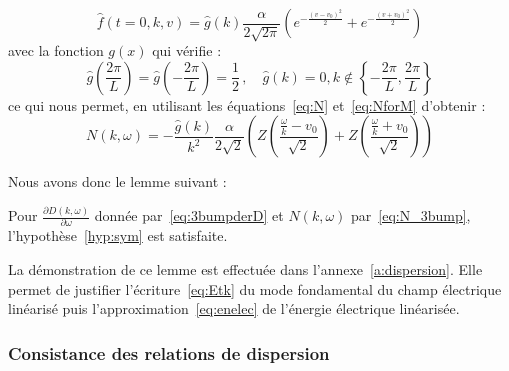 $$
  \hat{f}(t=0,k,v) = \hat{g}(k) \frac{\alpha}{2\sqrt{2\pi}}\left( e^{-\frac{(v-v_0)^2}{2}} + e^{-\frac{(v+v_0)^2}{2}} \right) 
$$
avec la fonction $g(x)$ qui vérifie :
$$ 
  \hat{g}\left(\frac{2\pi}{L}\right) = \hat{g}\left(-\frac{2\pi}{L}\right) = \frac{1}{2}\,,\quad \hat{g}(k) = 0, k\notin\left\{-\frac{2\pi}{L} ,\frac{2\pi}{L} \right\}
$$
ce qui nous permet, en utilisant les équations~\eqref{eq:N} et~\eqref{eq:NforM} d'obtenir :
\begin{equation}
  N(k,\omega) = -\frac{\hat{g}(k)}{k^2}\frac{\alpha}{2\sqrt{2}}\left( Z\left(\frac{\frac{\omega}{k}-v_0}{\sqrt{2}}\right) + Z\left(\frac{\frac{\omega}{k}+v_0}{\sqrt{2}}\right) \right)
  \label{eq:N_3bump}
\end{equation}

Nous avons donc le lemme suivant :
\begin{lemma}
  Pour $\frac{\partial D(k,\omega)}{\partial\omega}$ donnée par~\eqref{eq:3bumpderD} et $N(k,\omega)$ par~\eqref{eq:N_3bump}, l'hypothèse~\ref{hyp:sym} est satisfaite.
  \label{lemme:hypcascin}
\end{lemma}

La démonstration de ce lemme est effectuée dans l'annexe~\ref{a:dispersion}. Elle permet de justifier l'écriture~\eqref{eq:Etk} du mode fondamental du champ électrique linéarisé puis l'approximation~\eqref{eq:enelec} de l'énergie électrique linéarisée. 

\subsubsection{Consistance des relations de dispersion}

